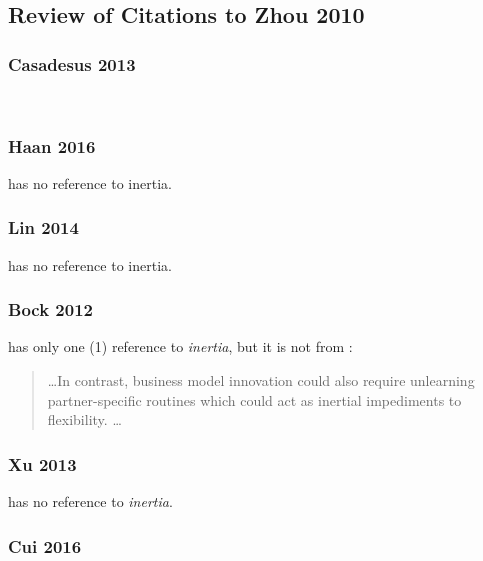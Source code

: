 \subsection{Review of Citations to Zhou 2010}

\subsubsection{Casadesus 2013}

\cite{casadesus2013business} \\

\subsubsection{Haan 2016}

\cite{haans2016thinking} has no reference to inertia. \\

\subsubsection{Lin 2014}

\cite{lin2014exploring} has no reference to inertia. \\

\subsubsection{Bock 2012}

\cite{bock2012effects} has only one (1) reference to \textit{inertia}, but it is not from \cite{zhou2010technological}: \\
\begin{quotation}
\ldots In contrast,
business model innovation could also require unlearning partner-specific routines which
could act as inertial impediments to flexibility. \ldots
\end{quotation}

\subsubsection{Xu 2013}

\cite{xu2013linking} has no reference to \textit{inertia}. \\

\subsubsection{Cui 2016}

